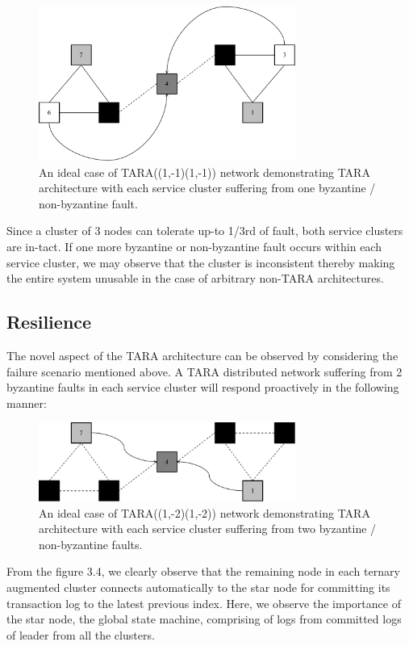 \documentclass[]{article}
\begin{document}
\begin{figure}[h]
	\centering
	\includegraphics[width=0.75\textwidth]{TARA(1,1)-2.png}
	\caption{An ideal case of TARA((1,-1)(1,-1)) network demonstrating TARA architecture with each service cluster suffering from one byzantine / non-byzantine fault.}
	\label{fig:manage-failure}
\end{figure}

Since a cluster of 3 nodes can tolerate up-to 1/3rd of fault, both service clusters are in-tact. If one more byzantine or non-byzantine fault occurs within each service cluster, we may observe that the cluster is inconsistent thereby making the entire system unusable in the case of arbitrary non-TARA architectures.

\subsection{Resilience}
The novel aspect of the TARA architecture can be observed by considering the failure scenario mentioned above. A TARA distributed network suffering from 2 byzantine faults in each service cluster will respond proactively in the following manner:

\begin{figure}[h]
	\centering
	\includegraphics[width=0.75\textwidth]{TARA(1,1)-4.png}
	\caption{An ideal case of TARA((1,-2)(1,-2)) network demonstrating TARA architecture with each service cluster suffering from two byzantine / non-byzantine faults.}
	\label{fig:resilience}
\end{figure}

From the figure 3.4, we clearly observe that the remaining node in each ternary augmented cluster connects automatically to the star node for committing its transaction log to the latest previous index. Here, we observe the importance of the star node, the global state machine, comprising of logs from committed logs of leader from all the clusters.
\end{document}
